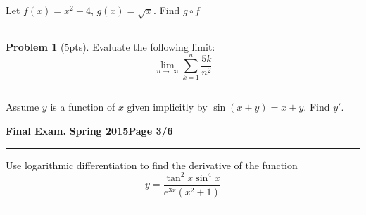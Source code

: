 \documentclass[12pt]{article}
\theoremstyle{definition}
\newtheorem{problem}{Problem}
\begin{document}
{ Let $f(x) = x^2+4$, $g(x) = \sqrt{x}$.  Find $g \circ f$
\vspace{2cm}
\begin{flushright}
\end{flushright}
\hrule

\begin{problem}[5pts]
Evaluate the following limit:
\begin{equation*}
\lim_{n \to \infty} \sum_{k=1}^n \frac{5k}{n^2}
\end{equation*}

\vspace{3cm}
\begin{flushright}
\end{flushright}
\end{problem}
\hrule

{\problem[5 pts] Assume $y$ is a function of $x$ given implicitly by $\sin(x+y)=x+y$.  Find $y'$.}
\vspace{4.9cm}
\begin{flushright}
\end{flushright}
\newpage


\hfill{\large\bf Final Exam.}\hfill{\large\bf
  Spring 2015}\hfill{\large\bf Page 3/6}\hrule

\bigskip


{\problem [10 pts] Use logarithmic differentiation to find the
  derivative of the function 
\begin{equation*}
y=\frac{\tan^2 x \sin^4 x}{e^{3x}(x^2+1)}
\end{equation*}
\vspace{8cm}
\begin{flushright}
\end{flushright}
\hrule

}}
\end{document}
